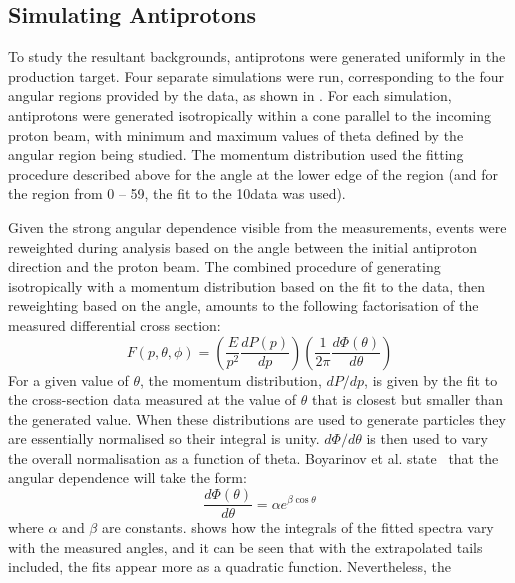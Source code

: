 \subsection{Simulating Antiprotons}
\TabAntiprotonRegions
To study the resultant backgrounds, antiprotons were generated uniformly in the production target.
Four separate simulations were run, corresponding to the four angular regions provided by the data, as shown in .
For each simulation, antiprotons were generated isotropically within a cone parallel to the incoming proton beam, with minimum and maximum values of theta defined by the angular region being studied.
The momentum distribution used the fitting procedure described above for the angle at the lower edge of the region (and for the region from 0 -- 59\degree, the fit to the 10\degree data was used).

Given the strong angular dependence visible from the measurements, events were reweighted during analysis based on the angle between the initial antiproton direction and the proton beam.
The combined procedure of generating isotropically with a momentum distribution based on the fit to the data, then reweighting based on the angle, amounts to the following factorisation of the measured differential cross section:
\begin{equation}
	F(p,\theta,\phi)=\left(\frac{E}{p^2}\frac{dP(p)}{dp}\right)\left(\frac{1}{2\pi}\frac{d\Phi(\theta)}{d\theta}\right)
\end{equation}
\FigAntiprotonAngularDependence
For a given value of $\theta$, the momentum distribution, $dP/dp$, is given by the fit to the cross-section data measured at the value of $\theta$ that is closest but smaller than the generated value.
When these distributions are used to generate particles they are essentially normalised so their integral is unity.
$d\Phi/d\theta$ is then used to vary the overall normalisation as a function of theta.
Boyarinov et al. state~\cite{Boyarinov:1994tp} that the angular dependence will take the form:
\begin{equation}
\frac{d\Phi(\theta)}{d\theta}=\alpha e^{\beta\cos\theta}
\end{equation}
where $\alpha$ and $\beta$ are constants.
 shows how the integrals of the fitted spectra vary with the measured angles, and it can be seen that with the extrapolated tails included, the fits appear more as a quadratic function.
Nevertheless, the 

